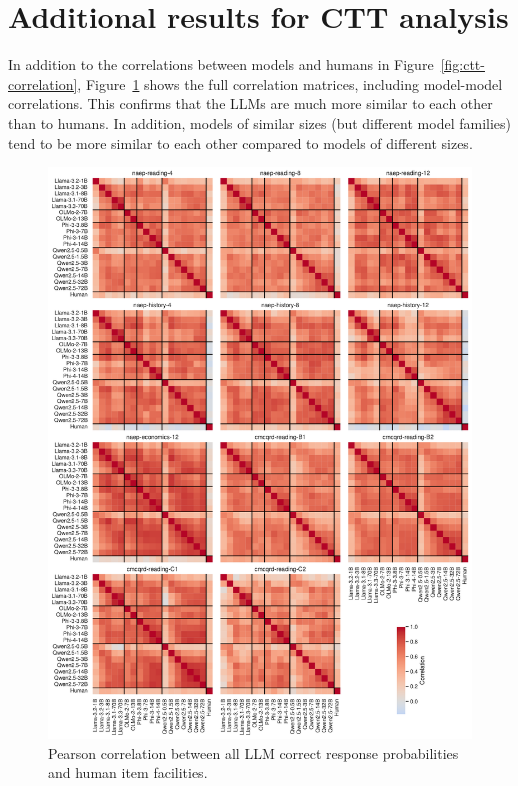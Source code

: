 \documentclass[11pt]{article}
\begin{document}
\section{Additional results for CTT analysis}
\label{sec:appendix-ctt}

In addition to the correlations between models and humans in Figure~\ref{fig:ctt-correlation}, Figure~\ref{fig:ctt-correlation-full} shows the full correlation matrices, including model-model correlations. This confirms that the LLMs are much more similar to each other than to humans. In addition, models of similar sizes (but different model families) tend to be more similar to each other compared to models of different sizes.

\begin{figure}
  \centering
  \includegraphics[width=\textwidth]{figures/ctt-correlation-full.pdf}
  \caption{Pearson correlation between all LLM correct response probabilities and human item facilities.}
  \label{fig:ctt-correlation-full}
\end{figure}
\end{document}
